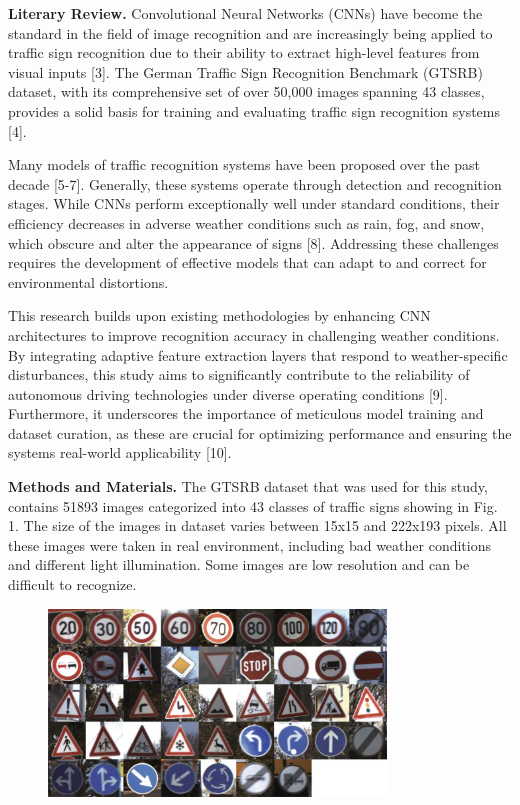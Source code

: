 {\bfseries Literary Review.} Convolutional Neural Networks (CNNs) have
become the standard in the field of image recognition and are
increasingly being applied to traffic sign recognition due to their
ability to extract high-level features from visual inputs {[}3{]}. The
German Traffic Sign Recognition Benchmark (GTSRB) dataset, with its
comprehensive set of over 50,000 images spanning 43 classes, provides a
solid basis for training and evaluating traffic sign recognition systems
{[}4{]}.

Many models of traffic recognition systems have been proposed over the
past decade {[}5-7{]}. Generally, these systems operate through
detection and recognition stages. While CNNs perform exceptionally well
under standard conditions, their efficiency decreases in adverse weather
conditions such as rain, fog, and snow, which obscure and alter the
appearance of signs {[}8{]}. Addressing these challenges requires the
development of effective models that can adapt to and correct for
environmental distortions.

This research builds upon existing methodologies by enhancing CNN
architectures to improve recognition accuracy in challenging weather
conditions. By integrating adaptive feature extraction layers that
respond to weather-specific disturbances, this study aims to
significantly contribute to the reliability of autonomous driving
technologies under diverse operating conditions {[}9{]}. Furthermore, it
underscores the importance of meticulous model training and dataset
curation, as these are crucial for optimizing performance and ensuring
the system\textquotesingle s real-world applicability {[}10{]}.

{\bfseries Methods and Materials.} The GTSRB dataset that was used for this
study, contains 51893 images categorized into 43 classes of traffic
signs showing in Fig. 1. The size of the images in dataset varies
between 15x15 and 222x193 pixels. All these images were taken in real
environment, including bad weather conditions and different light
illumination. Some images are low resolution and can be difficult to
recognize.

\begin{figure}[H]
	\centering
	\includegraphics[width=0.8\textwidth]{assets/57}
	\caption*{}
\end{figure}


